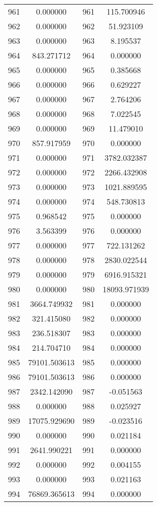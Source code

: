 \documentclass[12pt]{article}
\begin{document}
\begin{longtable}{@{}cccc@{}}
961 & 0.000000 & 961 & 115.700946 \\
962 & 0.000000 & 962 & 51.923109 \\
963 & 0.000000 & 963 & 8.195537 \\
964 & 843.271712 & 964 & 0.000000 \\
965 & 0.000000 & 965 & 0.385668 \\
966 & 0.000000 & 966 & 0.629227 \\
967 & 0.000000 & 967 & 2.764206 \\
968 & 0.000000 & 968 & 7.022545 \\
969 & 0.000000 & 969 & 11.479010 \\
970 & 857.917959 & 970 & 0.000000 \\
971 & 0.000000 & 971 & 3782.032387 \\
972 & 0.000000 & 972 & 2266.432908 \\
973 & 0.000000 & 973 & 1021.889595 \\
974 & 0.000000 & 974 & 548.730813 \\
975 & 0.968542 & 975 & 0.000000 \\
976 & 3.563399 & 976 & 0.000000 \\
977 & 0.000000 & 977 & 722.131262 \\
978 & 0.000000 & 978 & 2830.022544 \\
979 & 0.000000 & 979 & 6916.915321 \\
980 & 0.000000 & 980 & 18093.971939 \\
981 & 3664.749932 & 981 & 0.000000 \\
982 & 321.415080 & 982 & 0.000000 \\
983 & 236.518307 & 983 & 0.000000 \\
984 & 214.704710 & 984 & 0.000000 \\
985 & 79101.503613 & 985 & 0.000000 \\
986 & 79101.503613 & 986 & 0.000000 \\
987 & 2342.142090 & 987 & -0.051563 \\
988 & 0.000000 & 988 & 0.025927 \\
989 & 17075.929690 & 989 & -0.023516 \\
990 & 0.000000 & 990 & 0.021184 \\
991 & 2641.990221 & 991 & 0.000000 \\
992 & 0.000000 & 992 & 0.004155 \\
993 & 0.000000 & 993 & 0.021163 \\
994 & 76869.365613 & 994 & 0.000000 \\

\end{longtable}
\end{document}

